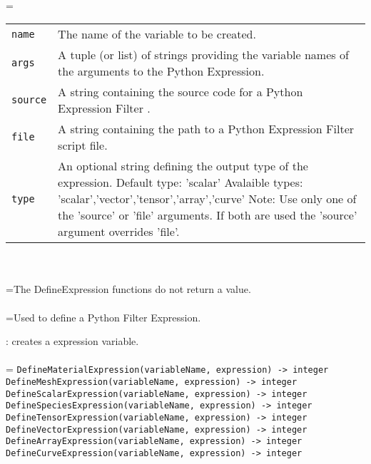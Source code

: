 \documentclass[10pt,a4paper]{report}
\begin{document}
 \\ 
\hangindent=\parindent 
\begin{tabular}{lp{9cm}}
\verb!name! & The name of the variable to be created. \\
\verb!args! & A tuple (or list) of strings providing the variable names of the arguments to the Python Expression. \\
\verb!source! & A string containing the source code for a Python Expression Filter . \\
\verb!file! & A string containing the path to a Python Expression Filter script file. \\
\verb!type! & An optional string defining the output type of the expression. Default type: 'scalar' Avalaible types: 'scalar','vector','tensor','array','curve' Note: Use only one of the 'source' or 'file' arguments. If both are used the 'source' argument overrides 'file'. \\
\end{tabular} \\[-2mm]


 \\ 
\hangindent=\parindent The DefineExpression functions do not return a value. \\[-3mm] 

 \\ 
\hangindent=\parindent Used to define a Python Filter Expression. \\[-3mm] 

\newpage


{}
: creates a expression variable.\\[-3mm]

 \\ 
\hangindent=\parindent 
\verb!DefineMaterialExpression(variableName, expression) -> integer!\\ 
\verb!DefineMeshExpression(variableName, expression) -> integer!\\ 
\verb!DefineScalarExpression(variableName, expression) -> integer!\\ 
\verb!DefineSpeciesExpression(variableName, expression) -> integer!\\ 
\verb!DefineTensorExpression(variableName, expression) -> integer!\\ 
\verb!DefineVectorExpression(variableName, expression) -> integer!\\ 
\verb!DefineArrayExpression(variableName, expression) -> integer!\\ 
\verb!DefineCurveExpression(variableName, expression) -> integer!\\ [-3mm]
\end{document}
